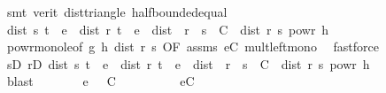\begin{isabellebody}
\ {\isacharparenleft}{\kern0pt}smt\ {\isacharparenleft}{\kern0pt}verit{\isacharparenright}{\kern0pt}\ dist{\isacharunderscore}{\kern0pt}triangle{}\ half{\isacharunderscore}{\kern0pt}bounded{\isacharunderscore}{\kern0pt}equal{\isacharparenright}{\kern0pt}\isanewline
\ \ \ \ \ \ \isamarkupfalse%
\ \isamarkupfalse%
\ {\isachardoublequoteopen}dist\ s\ t\ {\isasymle}\ {\isacharquery}{\kern0pt}e\ {\isasymand}\ dist\ r\ t\ {\isasymle}\ {\isacharquery}{\kern0pt}e\ {\isasymlongrightarrow}\ dist\ {\isacharparenleft}{\kern0pt}{\isasymphi}\ r{\isacharparenright}{\kern0pt}\ {\isacharparenleft}{\kern0pt}{\isasymphi}\ s{\isacharparenright}{\kern0pt}\ {\isasymle}\ C\ {\isacharasterisk}{\kern0pt}\ dist\ r\ s\ powr\ h{\isachardoublequoteclose}\isanewline
\ \ \ \ \ \ \ \ \isamarkupfalse%
\ powr{\isacharunderscore}{\kern0pt}mono{\isacharunderscore}{\kern0pt}le{}{\isacharbrackleft}{\kern0pt}of\ g\ h\ {\isachardoublequoteopen}dist\ r\ s{\isachardoublequoteclose}{\isacharcomma}{\kern0pt}\ OF\ assms{\isacharparenleft}{\kern0pt}{}{\isacharminus}{\kern0pt}{}{\isacharparenright}{\kern0pt}{\isacharbrackright}{\kern0pt}\ eC{\isacharparenleft}{\kern0pt}{}{\isacharparenright}{\kern0pt}\ mult{\isacharunderscore}{\kern0pt}left{\isacharunderscore}{\kern0pt}mono\ \isamarkupfalse%
\ fastforce\isanewline
\ \ \ \ \isacommand{{\isacharbraceright}{\kern0pt}}\isamarkupfalse%
\isanewline
\ \ \ \ \isamarkupfalse%
\ \isamarkupfalse%
\ {\isachardoublequoteopen}{\isacharparenleft}{\kern0pt}{\isasymforall}s{\isasymin}D{\isachardot}{\kern0pt}\ {\isasymforall}r{\isasymin}D{\isachardot}{\kern0pt}\ dist\ s\ t\ {\isasymle}\ {\isacharquery}{\kern0pt}e\ {\isasymand}\ dist\ r\ t\ {\isasymle}\ {\isacharquery}{\kern0pt}e\ {\isasymlongrightarrow}\ dist\ {\isacharparenleft}{\kern0pt}{\isasymphi}\ r{\isacharparenright}{\kern0pt}\ {\isacharparenleft}{\kern0pt}{\isasymphi}\ s{\isacharparenright}{\kern0pt}\ {\isasymle}\ C\ {\isacharasterisk}{\kern0pt}\ dist\ r\ s\ powr\ h{\isacharparenright}{\kern0pt}{\isachardoublequoteclose}\isanewline
\ \ \ \ \ \ \isamarkupfalse%
\ blast\isanewline
\ \ \ \ \isamarkupfalse%
\ \isamarkupfalse%
\ {\isachardoublequoteopen}{\isacharquery}{\kern0pt}e\ {\isachargreater}{\kern0pt}\ {}{\isachardoublequoteclose}\ {\isachardoublequoteopen}C\ {\isasymge}\ {}{\isachardoublequoteclose}\isanewline
\ \ \ \ \ \ \isamarkupfalse%
\ eC\ \isamarkupfalse%

\end{isabellebody}
